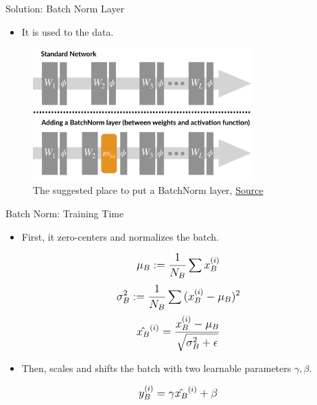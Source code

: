 \begin{frame}{Solution: Batch Norm Layer}
	\begin{itemize}
		\item It is used to  the data.
	\end{itemize}
	\begin{figure}[H]
		\centering
		\includegraphics[width=0.75\textwidth]{Figs/section_4/batchnorm_2.jpg}
		\caption{The suggested place to put a BatchNorm layer, \href{https://gradientscience.org/batchnorm/}{Source}}
	\end{figure}
\end{frame}
\begin{frame}{Batch Norm: Training Time}
	\begin{itemize}
		\item First, it zero-centers and normalizes the batch.
	\end{itemize}
	\vspace{0.05\textheight}
	\begin{equation*}
		\mathlarger{
			\mu_B := \frac{1}{N_B} \sum{x_B^{(i)}}
		}
	\end{equation*}
	\begin{equation*}
		\mathlarger{
			\sigma_B^2 := \frac{1}{N_B} \sum{(x_B^{(i)} - \mu_B)^2}
		}
	\end{equation*}
	\begin{equation*}
		\mathlarger{
			\hat{x_B}^{(i)} = \frac{x_B^{(i)} - \mu_B}{\sqrt{\sigma^2_B + \epsilon}}
		}
	\end{equation*}
	\begin{itemize}
		\item Then, scales and shifts the batch with two learnable parameters $\gamma, \beta$.
	\end{itemize}
	\vspace{0.05\textheight}
	\begin{equation*}
		\mathlarger{
			y_B^{(i)} = \gamma \hat{x_B}^{(i)} + \beta	
		}
	\end{equation*}
\end{frame}
